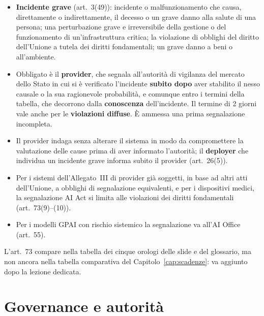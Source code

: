 \begin{integrazione}
\begin{itemize}
  \item \textbf{Incidente grave} (art.~3(49)): incidente o malfunzionamento che causa, direttamente o
    indirettamente, il decesso o un grave danno alla salute di una persona; una perturbazione grave e
    irreversibile della gestione o del funzionamento di un'infrastruttura critica; la violazione di
    obblighi del diritto dell'Unione a tutela dei diritti fondamentali; un grave danno a beni o
    all'ambiente.
  \item Obbligato è il \textbf{provider}, che segnala all'autorità di vigilanza del mercato dello Stato
    in cui si è verificato l'incidente \textbf{subito dopo} aver stabilito il nesso causale o la sua
    ragionevole probabilità, e comunque entro i termini della tabella, che decorrono dalla
    \textbf{conoscenza} dell'incidente. Il termine di 2 giorni vale anche per le \textbf{violazioni
    diffuse}. È ammessa una prima segnalazione incompleta.
  \item Il provider indaga senza alterare il sistema in modo da compromettere la valutazione delle
    cause prima di aver informato l'autorità; il \textbf{deployer} che individua un incidente grave
    informa subito il provider (art.~26(5)).
  \item Per i sistemi dell'Allegato~III di provider già soggetti, in base ad altri atti dell'Unione, a
    obblighi di segnalazione equivalenti, e per i dispositivi medici, la segnalazione AI Act
    si limita alle violazioni dei diritti fondamentali (art.~73(9)--(10)).
  \item Per i modelli GPAI con rischio sistemico la segnalazione va all'AI Office (art.~55).
\end{itemize}
\end{integrazione}

\begin{nota}
L'art.~73 compare nella tabella dei cinque orologi delle slide e del glossario, ma non ancora nella
tabella comparativa del Capitolo~\ref{cap:scadenze}: va aggiunto dopo la lezione dedicata.
\end{nota}

\section{Governance e autorità}
\label{sec:aiact-autorita}

